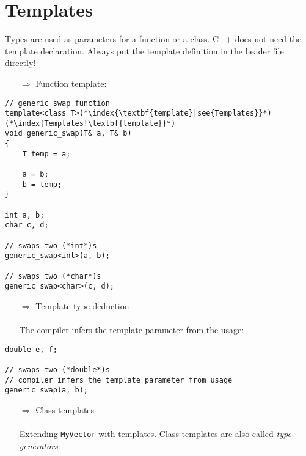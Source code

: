 \documentclass[10pt]{article}
\begin{document}
\section{Templates}
\small
Types are used as parameters for a function or a class.  C++ does not need the template declaration. Always put the 
template definition in the header file directly!
\begin{enumerate}
\item[$\Rightarrow$] Function template:
\end{enumerate}
\begin{lstlisting}
// generic swap function
template<class T>(*\index{\textbf{template}|see{Templates}}*)(*\index{Templates!\textbf{template}}*)
void generic_swap(T& a, T& b)
{
    T temp = a;
    
    a = b;
    b = temp;
}

int a, b;
char c, d;

// swaps two (*int*)s
generic_swap<int>(a, b);

// swaps two (*char*)s
generic_swap<char>(c, d);
\end{lstlisting}
\begin{enumerate}
\item[$\Rightarrow$] Template type deduction\\ \\ The compiler infers the template parameter from the usage:
\end{enumerate}
\begin{lstlisting}
double e, f;

// swaps two (*double*)s
// compiler infers the template parameter from usage
generic_swap(a, b);
\end{lstlisting}
\begin{enumerate}
\item[$\Rightarrow$] Class templates\\ \\ Extending \texttt{MyVector} with templates. Class templates are also called \emph{type generators}:
\end{enumerate}
\end{document}
